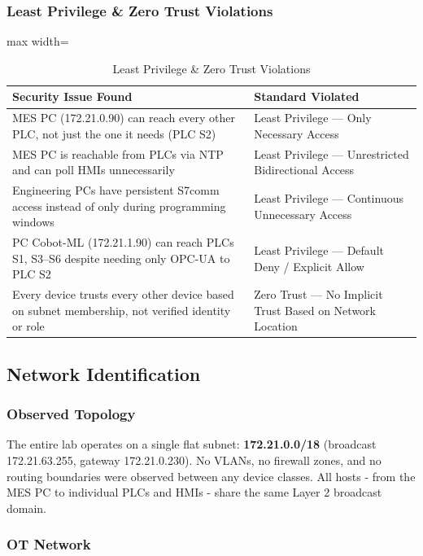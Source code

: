 \subsubsection{Least Privilege \& Zero Trust Violations}

\begin{table}[H]
\centering
\begin{adjustbox}{max width=\textwidth}
\begin{tabular}{@{}p{}p{}@{}}
\toprule
\textbf{Security Issue Found} & \textbf{Standard Violated} \\
\midrule
MES PC (172.21.0.90) can reach every other PLC, not just the one it needs (PLC S2) & Least Privilege — Only Necessary Access \\
MES PC is reachable from PLCs via NTP and can poll HMIs unnecessarily & Least Privilege — Unrestricted Bidirectional Access \\
Engineering PCs have persistent S7comm access instead of only during programming windows & Least Privilege — Continuous Unnecessary Access \\
PC Cobot-ML (172.21.1.90) can reach PLCs S1, S3–S6 despite needing only OPC-UA to PLC S2 & Least Privilege — Default Deny / Explicit Allow \\
Every device trusts every other device based on subnet membership, not verified identity or role & Zero Trust — No Implicit Trust Based on Network Location \\
\bottomrule
\end{tabular}
\end{adjustbox}
\caption{Least Privilege \& Zero Trust Violations} \end{table}
\subsection{Network Identification}

\subsubsection{Observed Topology}

The entire lab operates on a single flat subnet: \textbf{172.21.0.0/18} (broadcast 172.21.63.255, gateway 172.21.0.230). No VLANs, no firewall zones, and no routing boundaries were observed between any device classes. All hosts - from the MES PC to individual PLCs and HMIs - share the same Layer 2 broadcast domain.

\subsubsection{OT Network}

